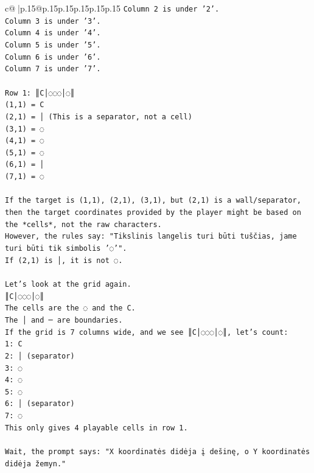 \documentclass{article}
\begin{document}
{\begin{supertabular}{c@{$\;$}|p{.15\linewidth}@{}p{.15\linewidth}p{.15\linewidth}p{.15\linewidth}p{.15\linewidth}p{.15\linewidth}}
{{{\texttt{Column 2 is under '2'.} \\
\texttt{Column 3 is under '3'.} \\
\texttt{Column 4 is under '4'.} \\
\texttt{Column 5 is under '5'.} \\
\texttt{Column 6 is under '6'.} \\
\texttt{Column 7 is under '7'.} \\
\\ 
\texttt{Row 1: ║C│◌◌◌│◌║} \\
\texttt{(1,1) = C} \\
\texttt{(2,1) = │ (This is a separator, not a cell)} \\
\texttt{(3,1) = ◌} \\
\texttt{(4,1) = ◌} \\
\texttt{(5,1) = ◌} \\
\texttt{(6,1) = │} \\
\texttt{(7,1) = ◌} \\
\\ 
\texttt{If the target is (1,1), (2,1), (3,1), but (2,1) is a wall/separator, then the target coordinates provided by the player might be based on the *cells*, not the raw characters.} \\
\texttt{However, the rules say: "Tikslinis langelis turi būti tuščias, jame turi būti tik simbolis '◌'".} \\
\texttt{If (2,1) is │, it is not ◌.} \\
\\ 
\texttt{Let's look at the grid again.} \\
\texttt{║C│◌◌◌│◌║} \\
\texttt{The cells are the ◌ and the C.} \\
\texttt{The │ and ─ are boundaries.} \\
\texttt{If the grid is 7 columns wide, and we see ║C│◌◌◌│◌║, let's count:} \\
\texttt{1: C} \\
\texttt{2: │ (separator)} \\
\texttt{3: ◌} \\
\texttt{4: ◌} \\
\texttt{5: ◌} \\
\texttt{6: │ (separator)} \\
\texttt{7: ◌} \\
\texttt{This only gives 4 playable cells in row 1.} \\
\\ 
\texttt{Wait, the prompt says: "X koordinatės didėja į dešinę, o Y koordinatės didėja žemyn."} \\
}}}
\end{supertabular}}
\end{document}
